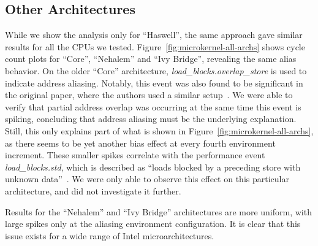 \documentclass[10pt, conference, compsocconf]{IEEEtran}
\begin{document}
\subsection{Other Architectures}
While we show the analysis only for ``Haswell'', the same approach gave similar results for all the CPUs we tested.
Figure~\ref{fig:microkernel-all-archs} shows cycle count plots for ``Core'', ``Nehalem'' and ``Ivy Bridge'', revealing the same alias behavior.
On the older ``Core'' architecture, \emph{load\_blocks.overlap\_store} is used to indicate address aliasing.
Notably, this event was also found to be significant in the original paper, where the authors used a similar setup~\cite{Mytkowicz:2009:WrongData}.
We were able to verify that partial address overlap was occurring at the same time this event is spiking, concluding that address aliasing must be the underlying explanation.
Still, this only explains part of what is shown in Figure~\ref{fig:microkernel-all-archs}, as there seems to be yet another bias effect at every fourth environment increment.
These smaller spikes correlate with the performance event \emph{load\_blocks.std}, which is described as ``loads blocked by a preceding store with unknown data''~\cite[Table 19-17]{Volume3B}.
We were only able to observe this effect on this particular architecture, and did not investigate it further.%

Results for the ``Nehalem'' and ``Ivy Bridge'' architectures are more uniform, with large spikes only at the aliasing environment configuration.
It is clear that this issue exists for a wide range of Intel microarchitectures.

\end{document}
